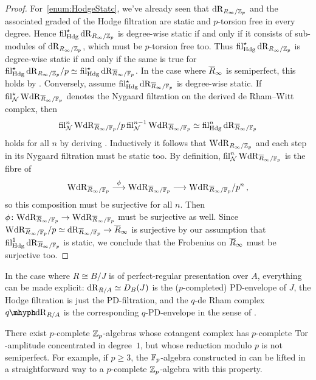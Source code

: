 \documentclass[DIV=12,numbers=enddot,leqno,bibliography=totoc]{scrartcl}
\begin{document}
\begin{proof}
		For~\cref{enum:HodgeStatc}, we've already seen that $\mathrm{dR}_{R_\infty/\mathbb{Z}_p}$ and the associated graded of the Hodge filtration are static and $p$-torsion free in every degree. Hence $\operatorname{fil}_{\mathrm{Hdg}}^\star\mathrm{dR}_{R_\infty/\mathbb{Z}_p}$ is degree-wise static if and only if it consists of sub-modules of $\mathrm{dR}_{R_\infty/\mathbb{Z}_p}$, which must be $p$-torsion free too. Thus $\operatorname{fil}_{\mathrm{Hdg}}^\star\mathrm{dR}_{R_\infty/\mathbb{Z}_p}$ is degree-wise static if and only if the same is true for $\fil_{\Hodge}^\star\deRham_{R_\infty/\IZ_p}/p\simeq \fil_{\Hodge}^\star\deRham_{\ov R_\infty/\IF_p}$. In the case where $\ov R_\infty$ is semiperfect, this holds by \cite[Proposition~]{BMS2}. Conversely, assume $\fil_{\Hodge}^\star\deRham_{\ov R_\infty/\IF_p}$ is degree-wise static. If $\fil_\Nn^\star\W\deRham_{\ov R_\infty/\IF_p}$ denotes the Nygaard filtration on the derived de Rham--Witt complex, then 
		\begin{equation*}
			\fil_\Nn^n\W\deRham_{\ov R_\infty/\IF_p}/p\fil_\Nn^{n-1}\W\deRham_{\ov R_\infty/\IF_p}\simeq \fil_{\Hodge}^n\deRham_{\ov R_\infty/\IF_p}
		\end{equation*}
		holds for all $n$ by deriving \cite[Lemma~]{BMS2}. Inductively it follows that $\mathrm{W}\mathrm{dR}_{R_\infty/\mathbb{Z}_p}$ and each step in its Nygaard filtration must be static too. By definition, $\fil_\Nn^n\W\deRham_{\ov R_\infty/\IF_p}$ is the fibre of
		\begin{equation*}
			\W\deRham_{\ov R_\infty/\IF_p}\overset{\phi}{\longrightarrow}\W\deRham_{\ov R_\infty/\IF_p}\longrightarrow \W\deRham_{\ov R_\infty/\IF_p}/p^n\,,
		\end{equation*}
		so this composition must be surjective for all $n$. Then $\phi\colon \W\deRham_{\ov R_\infty/\IF_p}\rightarrow\W\deRham_{\ov R_\infty/\IF_p}$ must be surjective as well. Since $\W\deRham_{\ov R_\infty/\IF_p}/p\simeq \deRham_{\ov R_\infty/\IF_p}\rightarrow \ov R_\infty$ is surjective by our assumption that $\fil_{\Hodge}^1\deRham_{\ov R_\infty/\IF_p}$ is static, we conclude that the Frobenius on $\ov R_\infty$ must be surjective too.
	\end{proof}
	\begin{rem}
		In the case where $R\cong B/J$ is of perfect-regular presentation over $A$, everything can be made explicit: $\mathrm{dR}_{R/A}\simeq D_B(J)$ is the ($p$-completed) PD-envelope of $J$, the Hodge filtration is just the PD-filtration, and the $q$-de Rham complex $\qdeRham_{R/A}$ is the corresponding $q$-PD-envelope in the sense of \cite[Lemma~]{Prismatic}.
	\end{rem}
	\begin{rem}
		There exist $p$-complete $\mathbb{Z}_p$-algebras whose cotangent complex has $p$-complete $\operatorname{Tor}$-amplitude concentrated in degree~$1$, but whose reduction modulo $p$ is not semiperfect. For example, if $p\geqslant 3$, the $\mathbb{F}_p$-algebra constructed in \cite{SemiperfectCounterexample} can be lifted in a straightforward way to a $p$-complete $\mathbb{Z}_p$-algebra with this property.
	\end{rem}
	
\end{document}
